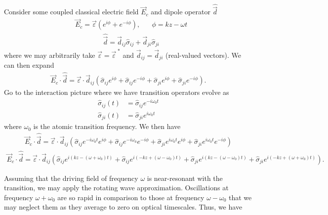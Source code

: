 \documentclass[aps,pra,showpacs,amsmath,amssymb,nofootinbib,longbibliography,superscriptaddress
]{revtex4-1}
\theoremstyle{definition}
\theoremstyle{remark}
\newcommand{\0}{\hat{0}}
\begin{document}
Consider some coupled classical electric field $\vec{E}_c$ and dipole operator $\hat{\vec{d}}$
\begin{align}
    &\vec{E}_c = \vec{\varepsilon} (e^{i\phi} + e^{-i\phi}),\;\;\;\;\;\;\phi = kz - \omega t
\end{align}
\begin{align}
    &\hat{\vec{d}} = \vec{d}_{ij} \hat{\sigma}_{ij} + \vec{d}_{ji} \hat{\sigma}_{ji}
\end{align}
where we may arbitrarily take $\vec{\varepsilon} = \vec{\varepsilon}^{\;*}$ and $\vec{d}_{ij} = \vec{d}_{ji}$ (real-valued vectors). We can then expand
\begin{align}
    \vec{E}_c \cdot \hat{\vec{d}} = \vec{\varepsilon} \cdot \vec{d}_{ij} \left(\hat{\sigma}_{ij} e^{i\phi} + \hat{\sigma}_{ij} e^{-i\phi} + \hat{\sigma}_{ji} e^{i\phi} + \hat{\sigma}_{ji} e^{-i\phi}\right).
\end{align}
Go to the interaction picture where we have transition operators evolve as
\begin{align}
    \hat{\sigma}_{ij}(t) &= \hat{\sigma}_{ij} e^{-i \omega_0 t}\\
    \hat{\sigma}_{ji}(t) &= \hat{\sigma}_{ji} e^{i \omega_0 t}
\end{align}
where $\omega_0$ is the atomic transition frequency. We then have
\begin{align*}
    \vec{E}_c \cdot \hat{\vec{d}} = \vec{\varepsilon} \cdot \vec{d}_{ij} \left(
        \hat{\sigma}_{ij} e^{-i \omega_0 t} e^{i\phi} +
        \hat{\sigma}_{ij} e^{-i \omega_0 } e^{-i\phi} +
        \hat{\sigma}_{ji} e^{i \omega_0 t} e^{i\phi} +
        \hat{\sigma}_{ji} e^{i \omega_0 t} e^{-i\phi}
    \right)
\end{align*}
\begin{align}
    \vec{E}_c \cdot \hat{\vec{d}} = 
    \vec{\varepsilon} \cdot \vec{d}_{ij} \left(
        \hat{\sigma}_{ij}e^{i(kz - (\omega + \omega_0)t)} +
        \hat{\sigma}_{ij} e^{i(-kz + (\omega - \omega_0) t)} +
        \hat{\sigma}_{ji} e^{i(kz - (\omega - \omega_0) t)} +
        \hat{\sigma}_{ji} e^{i(-kz + (\omega + \omega_0) t)}
    \right).
\end{align}

Assuming that the driving field of frequency $\omega$ is near-resonant with the transition, we may apply the rotating wave approximation. Oscillations at frequency $\omega + \omega_0$ are so rapid in comparison to those at frequency $\omega - \omega_0$ that we may neglect them as they average to zero on optical timescales. Thus, we have
\end{document}
